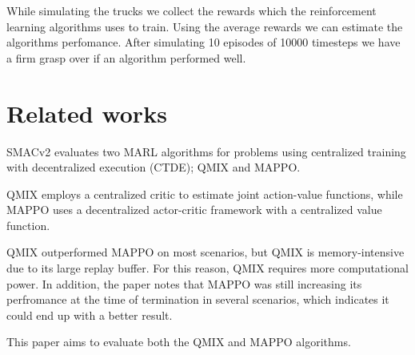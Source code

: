 \documentclass[conference]{IEEEtran}
\begin{document}
While simulating the trucks we collect the rewards which the reinforcement learning algorithms uses to train.
Using the average rewards we can estimate the algorithms perfomance. After simulating 10 episodes of 10000 timesteps we have a firm grasp over if an algorithm performed well.


\section{Related works}
SMACv2\cite{ellis2022smacv2} evaluates two MARL algorithms for problems using centralized training with
decentralized execution (CTDE); QMIX and MAPPO.

QMIX employs a centralized critic to estimate joint action-value functions, while MAPPO uses a decentralized
actor-critic framework with a centralized value function.

QMIX outperformed MAPPO on most scenarios, but QMIX is memory-intensive due to its large replay buffer. For
this reason, QMIX requires more computational power. In addition, the paper notes that MAPPO was still
increasing its perfromance at the time of termination in several scenarios, which indicates it could end up
with a better result.

This paper aims to evaluate both the QMIX and MAPPO algorithms.
\noindent




\newpage


\end{document}
